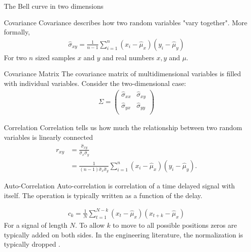 \documentclass[notes]{beamer}
\begin{document}
    \begin{frame}{The Bell curve in two dimensions}
      
    \end{frame}

    \begin{frame}{Covariance}
      Covariance describes how two random variables "vary together"\cite{haslwanter2016introduction}.
      More formally,
      \begin{align}
      \hat{\sigma}_{xy} = \frac{1}{n - 1}\sum_{i=1}^n (x_i - \hat{\mu}_x)(y_i - \hat{\mu}_y)
      \end{align}
      For two $n$ sized samples $x$ and $y$ and real numbers $x,y$ and $\mu$.
    \end{frame}

    \begin{frame}{Covariance Matrix}
      The covariance matrix of multidimensional variables is filled with individual variables.
      Consider the two-dimensional case:
      \begin{align}
        \Sigma = \begin{pmatrix}
          \hat{\sigma}_{xx} & \hat{\sigma}_{xy} \\
          \hat{\sigma}_{yx} & \hat{\sigma}_{yy} \\
        \end{pmatrix}
      \end{align}

    \end{frame}


    \begin{frame}{Correlation}
    Correlation tells us how much the relationship between two random variables is linearly connected
    \cite{haslwanter2016introduction}
    \begin{align}
      r_{xy} & = \frac{\hat{\sigma}_{xy}}{\hat{\sigma}_x \hat{\sigma}_y} \\
             & = \frac{1}{{(n-1)} \hat{\sigma}_x \hat{\sigma}_y} \sum_{i=1}^{n} (x_i - \hat{\mu}_x)(y_i - \hat{\mu}_y).
    \end{align}
  
  \end{frame}

    \begin{frame}{Auto-Correlation}
      Auto-correlation \cite{haslwanter2016introduction} is correlation of a time delayed signal with itself.
      The operation is typically written as a function of the delay.

      \begin{align}
        c_{k} = \frac{1}{N}\sum_{t=1}^{N-k} (x_t - \hat{\mu}_x)(x_{t + k} - \hat{\mu}_x)
      \end{align}
      For a signal of length $N$. To allow $k$ to move to all possible positions zeros are typically added
      on both sides.
      In the engineering literature, the normalization is typically dropped \cite{haslwanter2016introduction}.

    \end{frame}
\end{document}
